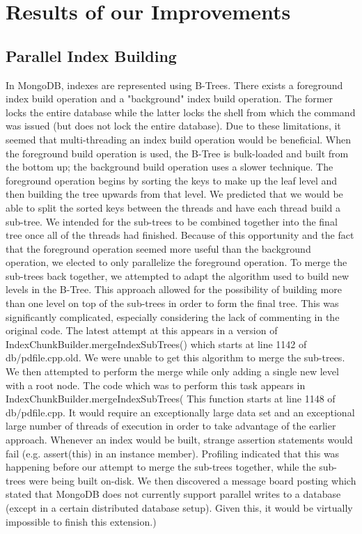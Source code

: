 \documentclass{../dependencies/acm_proc_article-sp}
\begin{document}
\section{Results of our Improvements}
\subsection{Parallel Index Building}
In MongoDB, indexes are represented using B-Trees.
There exists a foreground index build operation and a "background" index build operation.
The former locks the entire database while the latter locks the shell from which the command was issued (but does not lock the entire database).
Due to these limitations, it seemed that multi-threading an index build operation would be beneficial.
When the foreground build operation is used, the B-Tree is bulk-loaded and built from the bottom up; the background build operation uses a slower technique\cite{1}.
The foreground operation begins by sorting the keys to make up the leaf level and then building the tree upwards from that level.
We predicted that we would be able to split the sorted keys between the threads and have each thread build a sub-tree.
We intended for the sub-trees to be combined together into the final tree once all of the threads had finished.
Because of this opportunity and the fact that the foreground operation seemed more useful than the background operation, we elected to only parallelize the foreground operation.
To merge the sub-trees back together, we attempted to adapt the algorithm used to build new levels in the B-Tree.
This approach allowed for the possibility of building more than one level on top of the sub-trees in order to form the final tree.
This was significantly complicated, especially considering the lack of commenting in the original code.
The latest attempt at this appears in a version of IndexChunkBuilder.mergeIndexSubTrees() which starts at line 1142 of db/pdfile.cpp.old.
We were unable to get this algorithm to merge the sub-trees.
We then attempted to perform the merge while only adding a single new level with a root node.
The code which was to perform this task appears in IndexChunkBuilder.mergeIndexSubTrees( This function starts at line 1148 of db/pdfile.cpp.
It would require an exceptionally large data set and an exceptional large number of threads of execution in order to take advantage of the earlier approach.
Whenever an index would be built, strange assertion statements would fail (e.g. assert(this) in an instance member).
Profiling indicated that this was happening before our attempt to merge the sub-trees together, while the sub-trees were being built on-disk.
We then discovered a message board posting which stated that MongoDB does not currently support parallel writes to a database\cite{2} (except in a certain distributed database setup)\cite{3}.
Given this, it would be virtually impossible to finish this extension.)
\end{document}
